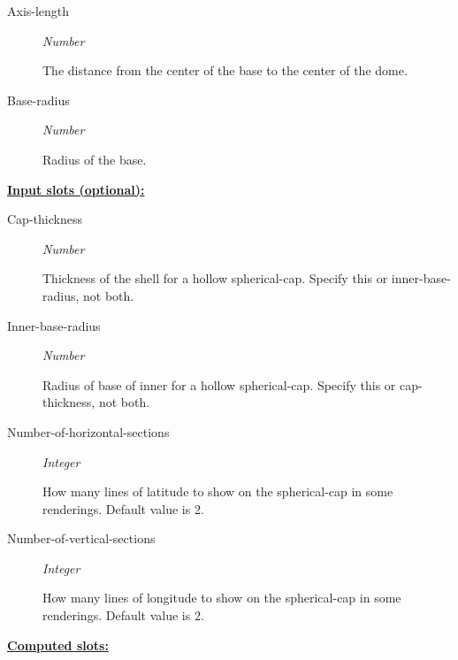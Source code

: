 \documentclass [11pt]{book}
\begin{document}
\begin{itemize}
\begin{description}
\item [Axis-length]
\emph{Number}

 The distance from the center of the base to the center of the dome.




\item [Base-radius]
\emph{Number}

 Radius of the base.




\end{description}






\textbf{
\underline{Input slots (optional):}}

\begin{description}

\item [Cap-thickness]
\emph{Number}

 Thickness of the shell for a hollow spherical-cap. Specify this
or inner-base-radius, not both.




\item [Inner-base-radius]
\emph{Number}

 Radius of base of inner for a hollow spherical-cap. Specify this
or cap-thickness, not both.




\item [Number-of-horizontal-sections]
\emph{Integer}

 How many lines of latitude to show on the spherical-cap in some renderings. Default value is 2.




\item [Number-of-vertical-sections]
\emph{Integer}

 How many lines of longitude to show on the spherical-cap in some renderings. Default value is 2.




\end{description}






\textbf{
\underline{Computed slots:}}


\end{itemize}
\end{document}
